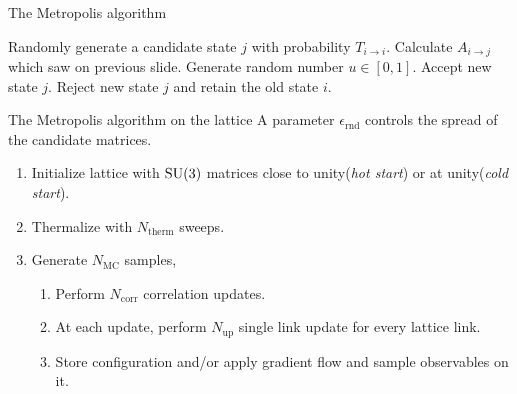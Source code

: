\documentclass[10pt,show notes on second screen]{beamer}
\begin{document}
\begin{frame}{The Metropolis algorithm}
\begin{algorithmic}
    \Repeat
        \State Randomly generate a candidate state $j$ with probability $T_{i\rightarrow i}$.
        \State Calculate $A_{i\rightarrow j}$ which saw on previous slide.
        \State Generate random number $u\in[0,1]$.
            \State Accept new state $j$.
            \State Reject new state $j$ and retain the old state $i$.
        \EndIf
\end{algorithmic}
\end{frame}

\begin{frame}{The Metropolis algorithm on the lattice}
A parameter $\epsilon_\mathrm{rnd}$ controls the spread of the candidate matrices.
\begin{enumerate}
    \item Initialize lattice with $\mathrm{SU}(3)$ matrices close to unity(\textit{hot start}) or at unity(\textit{cold start}).
    \item Thermalize with $N_\mathrm{therm}$ sweeps.
    \item Generate $N_\mathrm{MC}$ samples,
    \begin{enumerate}[i]
        \item Perform $N_\mathrm{corr}$ correlation updates.
        \item At each update, perform $N_\mathrm{up}$ single link update for every lattice link.
        \item Store configuration and/or apply gradient flow and sample observables on it.
    \end{enumerate}
\end{enumerate}
\end{frame}
\end{document}
